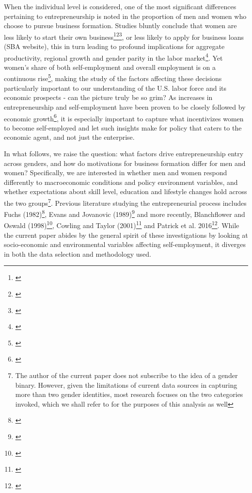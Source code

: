 When the individual level is considered, one of the most significant differences pertaining to
entrepreneurship is noted in the proportion of men and women who choose to pursue business formation. Studies bluntly conclude that women are less likely to start their own business\footnote{\cite{kennickell2006currents}}\hspace{.15em}\footnote{\cite{PatrickStephensWeinstein2016}}\hspace{.15em}\footnote{\cite{koellinger2013gender}}, or less likely to apply for business loans (SBA website), this in turn leading to profound implications for aggregate productivity, regional growth and gender parity in the labor market\footnote{\cite{ReynoldsWhite1997}}. Yet women’s share of both self-employment and overall employment is on a continuous rise\footnote{\cite{PatrickStephensWeinstein2016}}, making the study of the factors affecting these decisions particularly important to our understanding of the U.S. labor force and its economic prospects  - can the picture truly be so grim? As increases in entrepreneurship and self-employment have been proven to be closely followed by economic growth\footnote{\cite{ReynoldsWhite1997}}, it is especially important to capture what incentivizes women to become self-employed and let such insights make for policy that caters to the economic agent, and not just the enterprise.

In what follows, we raise the question: what factors drive entrepreneurship entry across genders, and how do motivations for business formation differ for men and women? Specifically, we are interested in whether men and women respond differently to macroeconomic conditions and policy environment variables, and whether expectations about skill level, education and lifestyle changes hold across the two groups\footnote{The author of the current paper does not subscribe to the idea of a gender binary. However, given the limitations of current data sources in capturing more than two gender identities, most research focuses on the two categories invoked, which we shall refer to for the purposes of this analysis as well}. Previous literature studying the entrepreneurial process includes Fuchs (1982)\footnote{\cite{}}, Evans and Jovanovic (1989)\footnote{\cite{EvansJovanovic1989}} and more recently, Blanchflower and Oswald (1998)\footnote{\cite{BlanchflowerOswald1998}}, Cowling and Taylor (2001)\footnote{\cite{CowlingTaylor2001}} and Patrick et al. 2016\footnote{\cite{PatrickStephensWeinstein2016}}.  While the current paper abides by the general spirit of these investigations by looking at socio-economic and environmental variables affecting self-employment, it diverges in both the data selection and methodology used. 


